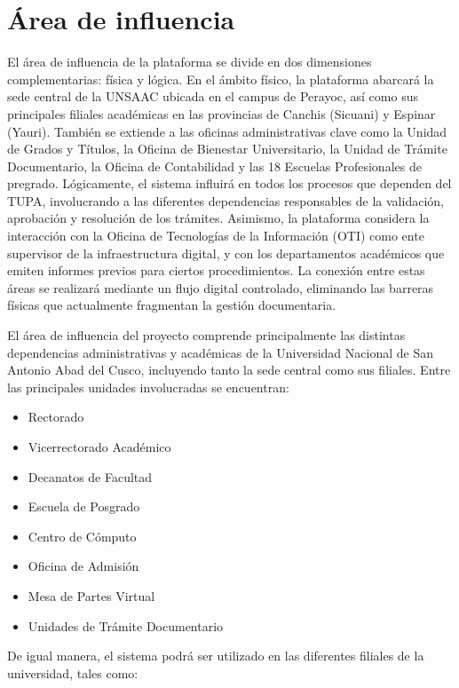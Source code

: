 \section{Área de influencia}

El área de influencia de la plataforma se divide en dos dimensiones complementarias: física y lógica. 
En el ámbito físico, la plataforma abarcará la sede central de la UNSAAC ubicada en el campus de Perayoc, 
así como sus principales filiales académicas en las provincias de Canchis (Sicuani) y Espinar (Yauri). 
También se extiende a las oficinas administrativas clave como la Unidad de Grados y Títulos, la Oficina 
de Bienestar Universitario, la Unidad de Trámite Documentario, la Oficina de Contabilidad y las 18 Escuelas 
Profesionales de pregrado. Lógicamente, el sistema influirá en todos los procesos que dependen del TUPA, 
involucrando a las diferentes dependencias responsables de la validación, aprobación y resolución de los 
trámites. Asimismo, la plataforma considera la interacción con la Oficina de Tecnologías de la Información 
(OTI) como ente supervisor de la infraestructura digital, y con los departamentos académicos que emiten 
informes previos para ciertos procedimientos. La conexión entre estas áreas se realizará mediante un flujo 
digital controlado, eliminando las barreras físicas que actualmente fragmentan la gestión documentaria.

El área de influencia del proyecto comprende principalmente las distintas dependencias administrativas y 
académicas de la Universidad Nacional de San Antonio Abad del Cusco, incluyendo tanto la sede central 
como sus filiales. Entre las principales unidades involucradas se encuentran:

\begin{itemize}
    \item Rectorado
    \item Vicerrectorado Académico
    \item Decanatos de Facultad
    \item Escuela de Posgrado
    \item Centro de Cómputo
    \item Oficina de Admisión
    \item Mesa de Partes Virtual
    \item Unidades de Trámite Documentario
\end{itemize}

De igual manera, el sistema podrá ser utilizado en las diferentes filiales de la universidad, tales como:

